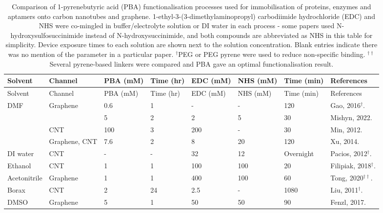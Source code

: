 \documentclass[
  a4paper,
]{scrbook}
\begin{document}
\newpage
{}

\hfill\break
\hfill\break

\hypertarget{tbl-pba-functionalisation}{}
\begin{longtable}[]{@{}llllllll@{}}
\caption{\label{tbl-pba-functionalisation}Comparison of 1-pyrenebutyric
acid (PBA) functionalisation processes used for immobilisation of
proteins, enzymes and aptamers onto carbon nanotubes and graphene.
1-ethyl-3-(3-dimethylaminopropyl) carbodiimide hydrochloride (EDC) and
NHS were co-mingled in buffer/electrolyte solution or DI water in each
process - some papers used N-hydroxysulfosuccinimide instead of
N-hydroxysuccinimide, and both compounds are abbreviated as NHS in this
table for simplicity. Device exposure times to each solution are shown
next to the solution concentration. Blank entries indicate there was no
mention of the parameter in a particular paper. \(^†\)PEG or PEG pyrene
were used to reduce non-specific binding. \(^{††}\)Several pyrene-based
linkers were compared and PBA gave an optimal functionalisation
result.}\tabularnewline
\toprule\noalign{}
Solvent & Channel & PBA (mM) & Time (hr) & EDC (mM) & NHS (mM) & Time
(min) & References \\
\midrule\noalign{}
\endfirsthead
\toprule\noalign{}
Solvent & Channel & PBA (mM) & Time (hr) & EDC (mM) & NHS (mM) & Time
(min) & References \\
\midrule\noalign{}
\endhead
\bottomrule\noalign{}
\endlastfoot
DMF & Graphene & 0.6 & 1 & - & - & 120 & Gao, 2016\(^†\).
\cite{Gao2016} \\
& & 5 & 2 & 2 & 5 & 30 & Mishyn, 2022. \cite{Mishyn2022} \\
& CNT & 100 & 3 & 200 & - & 30 & Min, 2012. \cite{Min2012} \\
& Graphene, CNT & 7.6 & 2 & 8 & 20 & 120 & Xu, 2014. \cite{Xu2014} \\
DI water & CNT & - & - & 32 & 12 & Overnight & Pacios, 2012\(^†\).
\cite{Pacios2012} \\
Ethanol & CNT & 1 & 1 & 100 & 100 & 20 & Filipiak, 2018\(^†\).
\cite{Filipiak2018} \\
Acetonitrile & Graphene & 1 & 1 & 400 & 100 & 60 & Tong, 2020\(^{††}\).
\cite{Tong2020} \\
Borax & CNT & 2 & 24 & 2.5 & - & 1080 & Liu, 2011\(^†\).
\cite{Liu2011} \\
DMSO & Graphene & 5 & 1 & 50 & 50 & 90 & Fenzl, 2017.
\cite{Fenzl2017} \\
\end{longtable}
\end{document}
